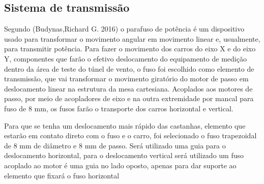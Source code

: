     
    
    
    
\subsection{Sistema de transmissão}\label{subsec:mettransmissao}

Segundo (Budynas,Richard G. 2016)  o parafuso de potência é um dispositivo usado para transformar 
o movimento angular em movimento linear e, usualmente, para transmitir potência. Para fazer o movimento 
dos carros do eixo X e do eixo Y, componentes que farão o efetivo deslocamento do equipamento de medição 
dentro da área de teste do túnel de vento, o fuso foi escolhido como elemento de transmissão, que vai 
transformar o movimento giratório do motor de passo em deslocamento linear na estrutura da mesa cartesiana. 
Acoplados aos motores de passo, por meio de acopladores de eixo e na outra extremidade por mancal para fuso 
de 8 mm, os fusos farão o transporte dos carros horizontal e vertical. 

Para que se tenha um deslocamento mais rápido das castanhas, elemento que estarão em contato 
direto com o fuso e o carro, foi selecionado o fuso trapezoidal de  8 mm de diâmetro e 8 mm de passo.  
Será utilizado uma guia para o deslocamento horizontal, para o deslocamento vertical será utilizado 
um fuso acoplado ao motor é uma guia no lado oposto, apenas para dar suporte ao elemento que fixará 
o fuso horizontal 

